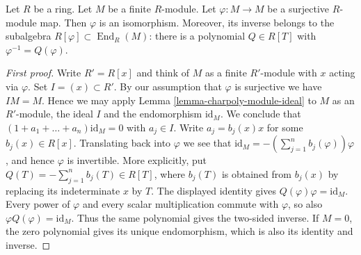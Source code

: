 \begin{lemma}
\label{lemma-fun}
Let $R$ be a ring.
Let $M$ be a finite $R$-module.
Let $\varphi : M \to M$ be a surjective $R$-module map.
Then $\varphi$ is an isomorphism. Moreover, its inverse belongs
to the subalgebra $R[\varphi]\subset\operatorname{End}_R(M)$:
there is a polynomial $Q\in R[T]$ with $\varphi^{-1}=Q(\varphi)$.
\end{lemma}

\begin{proof}[First proof]
Write $R' = R[x]$ and think of $M$ as a finite $R'$-module with
$x$ acting via $\varphi$. Set $I = (x) \subset R'$. By our assumption that
$\varphi$ is surjective we have $IM = M$. Hence we may apply
Lemma \ref{lemma-charpoly-module-ideal}
to $M$ as an $R'$-module, the ideal $I$ and the endomorphism $\text{id}_M$.
We conclude that
$(1 + a_1 + \ldots + a_n)\text{id}_M = 0$ with $a_j \in I$.
Write $a_j = b_j(x)x$ for some $b_j(x) \in R[x]$.
Translating back into $\varphi$ we see that
$\text{id}_M = -(\sum_{j = 1}^{n} b_j(\varphi)) \varphi$, and hence
$\varphi$ is invertible. More explicitly, put
$Q(T)=-\sum_{j=1}^{n}b_j(T)\in R[T]$, where $b_j(T)$ is
obtained from $b_j(x)$ by replacing its indeterminate $x$ by $T$.
The displayed identity gives $Q(\varphi)\varphi=\mathrm{id}_M$.
Every power of $\varphi$ and every scalar multiplication commute
with $\varphi$, so also $\varphi Q(\varphi)=\mathrm{id}_M$.
Thus the same polynomial gives the two-sided inverse.
If $M=0$, the zero polynomial gives its unique endomorphism,
which is also its identity and inverse.
\end{proof}